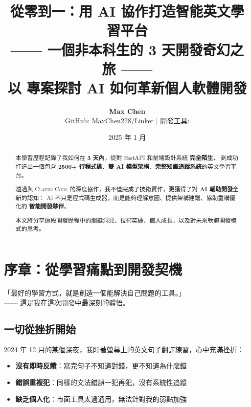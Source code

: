 \documentclass[11pt,a4paper]{article}
\title{
  \vspace{-2cm}
  \textbf{\Huge 從零到一：用 AI 協作打造智能英文學習平台}\\[8pt]
  \large —— 一個非本科生的 3 天開發奇幻之旅 ——\\[12pt]
  \normalsize 以 \Product{} 專案探討 AI 如何革新個人軟體開發
}
\author{
  \textbf{Max Chen}\\
  \small GitHub: \href{https://github.com/MaxChen228/Linker}{MaxChen228/Linker} 
  \quad|\quad 
  開發工具: \Claude{}
}
\date{2025 年 1 月}
\newcommand{\Claude}{\textsc{Claude Code}}
\begin{document}
\maketitle
\thispagestyle{empty}

\begin{abstract}
\noindent
本學習歷程記錄了我如何在 \textbf{3 天內}，從對 FastAPI 和前端設計系統 \textbf{完全陌生}，
到成功打造出一個包含 \textbf{2500+ 行程式碼}、\textbf{雙 AI 模型架構}、\textbf{完整知識追蹤系統}的英文學習平台。

透過與 \Claude{} 的深度協作，我不僅完成了技術實作，更獲得了對 \textbf{AI 輔助開發}全新的認知：
AI 不只是程式碼生成器，而是能夠理解意圖、提供架構建議、協助重構優化的 \textbf{智能開發夥伴}。

本文將分享這段開發歷程中的關鍵洞見、技術突破、個人成長，以及對未來軟體開發模式的思考。
\end{abstract}

\vspace{1cm}

\section{序章：從學習痛點到開發契機}

\begin{growth}
「最好的學習方式，就是創造一個能解決自己問題的工具。」\\
—— 這是我在這次開發中最深刻的體悟。
\end{growth}

\subsection{一切從挫折開始}

2024 年 12 月的某個深夜，我盯著螢幕上的英文句子翻譯練習，心中充滿挫折：

\begin{itemize}
  \item[\faTimesCircle] \textbf{沒有即時反饋}：寫完句子不知道對錯，更不知道為什麼錯
  \item[\faTimesCircle] \textbf{錯誤重複犯}：同樣的文法錯誤一犯再犯，沒有系統性追蹤
  \item[\faTimesCircle] \textbf{缺乏個人化}：市面工具太過通用，無法針對我的弱點加強
\end{itemize}
\end{document}
